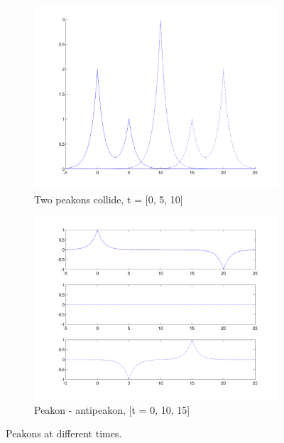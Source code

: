 \begin{figure}[h]
\begin{subfigure}[b]{0.49\textwidth}
                \includegraphics[width=\textwidth]{gfx/peakonovertake}
                \caption{Two peakons collide, t = [0, 5, 10]}
                \label{fig:peakonovertake}
        \end{subfigure}
        \begin{subfigure}[b]{0.49\textwidth}
                \includegraphics[width=\textwidth]{gfx/peakonantipeakon}
                \caption{Peakon - antipeakon, [t = 0, 10, 15]}
                \label{fig:peakonantipeakon}
        \end{subfigure}
        \caption{Peakons at different times.}
\end{figure}